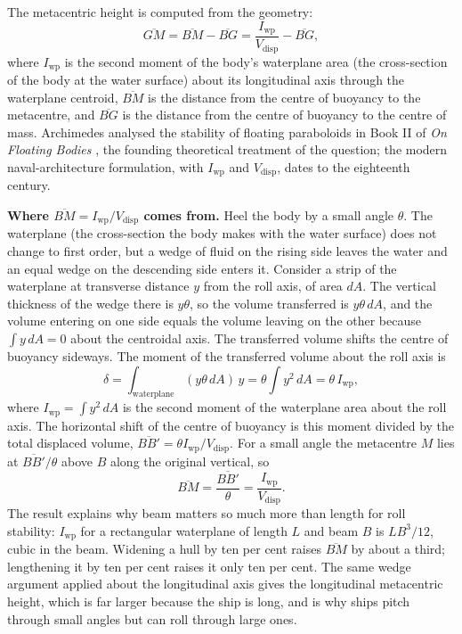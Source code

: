 The metacentric height is computed from the geometry:
\[
\overline{GM} = \overline{BM} - \overline{BG} = \frac{I_{\text{wp
}}}{V_{\text{disp}}} - \overline{BG},
\]
where $I_{\text{wp}}$ is the second moment of the body's
waterplane area (the cross-section of the body at the water
surface) about its longitudinal axis through the waterplane
centroid, $\overline{BM}$ is the distance from the centre of
buoyancy to the metacentre, and $\overline{BG}$ is the distance
from the centre of buoyancy to the centre of mass. Archimedes
analysed the stability of floating paraboloids in Book II of
\emph{On Floating Bodies} \cite[Book II]{
hist:archimedes-floating}, the founding theoretical treatment of
the question; the modern naval-architecture formulation, with
$I_{\text{wp}}$ and $V_{\text{disp}}$, dates to the eighteenth
century.



\begin{mastery}
\textbf{Where $\overline{BM} = I_{\text{wp}}/V_{\text{disp}}$ comes
from.} Heel the body by a small angle $\theta$. The waterplane (the
cross-section the body makes with the water surface) does not change to
first order, but a wedge of fluid on the rising side leaves the water
and an equal wedge on the descending side enters it. Consider a strip
of the waterplane at transverse distance $y$ from the roll axis, of
area $dA$. The vertical thickness of the wedge there is $y\theta$, so
the volume transferred is $y\theta\,dA$, and the volume entering on one
side equals the volume leaving on the other because $\int y\,dA = 0$
about the centroidal axis. The transferred volume shifts the centre of
buoyancy sideways. The moment of the transferred volume about the roll
axis is
\[
\delta = \int_{\text{waterplane}} (y\theta\,dA)\, y
= \theta \int y^2 \,dA = \theta\, I_{\text{wp}},
\]
where $I_{\text{wp}} = \int y^2\,dA$ is the second moment of the
waterplane area about the roll axis. The horizontal shift of the centre
of buoyancy is this moment divided by the total displaced volume,
$\overline{BB'} = \theta I_{\text{wp}}/V_{\text{disp}}$. For a small
angle the metacentre $M$ lies at $\overline{BB'}/\theta$ above $B$ along
the original vertical, so
\[
\overline{BM} = \frac{\overline{BB'}}{\theta}
= \frac{I_{\text{wp}}}{V_{\text{disp}}}.
\]
The result explains why beam matters so much more than length for roll
stability: $I_{\text{wp}}$ for a rectangular waterplane of length $L$
and beam $B$ is $LB^3/12$, cubic in the beam. Widening a hull by ten
per cent raises $\overline{BM}$ by about a third; lengthening it by ten
per cent raises it only ten per cent. The same wedge argument applied
about the longitudinal axis gives the longitudinal metacentric height,
which is far larger because the ship is long, and is why ships pitch
through small angles but can roll through large ones.
\end{mastery}

